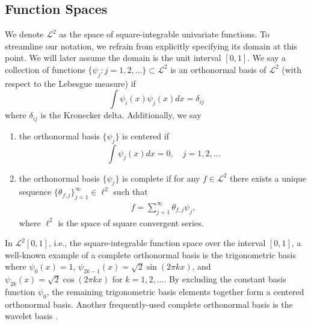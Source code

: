 \subsection{Function Spaces} \label{subsec:space}
We denote $\mathcal{L}^2$ as the space of square-integrable univariate functions. To streamline our notation, we  refrain from explicitly specifying its domain at this point. We will later assume the domain is the unit interval $[0,1]$. We say a collection of functions $\{\psi_j: j=1,2,\dots\} \subset \mathcal{L}^2$ is an orthonormal basis of $\mathcal{L}^2$ (with respect to the Lebesgue measure) if 
$$
\int \psi_i(x)\psi_j(x)dx = \delta_{ij}
$$
where $\delta_{ij}$ is the Kronecker delta. Additionally, we say 
\begin{enumerate}
    \item[(i)] the orthonormal basis $\{\psi_j\}$ is centered if 
    $$
    \int \psi_j(x)dx = 0, \quad j=1,2,\dots
    $$
    \item[(ii)] the orthonormal basis $\{\psi_j\}$ is complete if for any $f \in \mathcal{L}^2$ there exists a unique sequence $\{\theta_{f,j}\}_{j=1}^\infty \in \ell^2$ such that
\begin{align*}
    f = \sum_{j=1}^\infty \theta_{f,j}\psi_j,
\end{align*}
where $\ell^2$ is the space of square convergent series.
\end{enumerate}
In $\mathcal{L}^2[0,1]$, i.e., the square-integrable function space over the interval $[0,1]$, a well-known example of a complete orthonormal basis is the trigonometric basis where $\psi_0(x) = 1 $, $\psi_{2k-1}(x) = \sqrt{2}\sin(2\pi kx)$, and $ \psi_{2k}(x) = \sqrt{2}\cos(2\pi kx)$ for $k=1,2,\dots$. By excluding the constant basis function $\psi_0$, the remaining trigonometric basis elements together form a centered orthonormal basis. Another frequently-used  complete orthonormal basis is the wavelet basis \citep{DBLP:books/daglib/0035708}.


